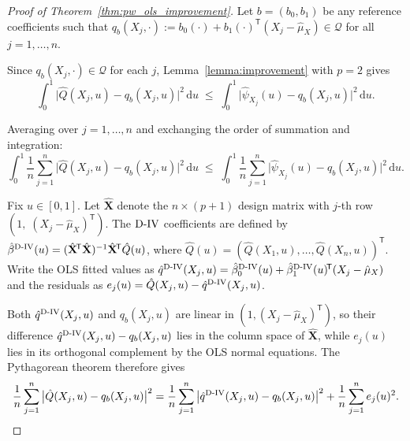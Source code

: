 \documentclass[12pt]{article}
\newcommand{\T}{\mathsf{T}} %
\newcommand{\est}{\ensuremath{\textnormal{D-IV}}\xspace}
\newcommand{\dd}{\mathrm{d}} %
\begin{document}
\begin{proof}[Proof of Theorem~\ref{thm:pw_ols_improvement}]
Let $b = (b_0, b_1)$ be any reference coefficients such that $q_b(X_j, \cdot) := b_0(\cdot) + b_1(\cdot)^{\!\T}(X_j - \hat{\mu}_X) \in \mathcal{Q}$ for all $j = 1, \ldots, n$.

\medskip
Since $q_b(X_j, \cdot) \in \mathcal{Q}$ for each $j$, Lemma~\ref{lemma:improvement} with $p = 2$ gives
\[
\int_0^1 \big|\hat{Q}(X_j, u) - q_b(X_j, u)\big|^2\, \dd u \;\leq\; \int_0^1 \big|\hat{\psi}_{X_j}(u) - q_b(X_j, u)\big|^2\, \dd u.
\]


Averaging over $j = 1, \ldots, n$ and exchanging the order of summation and integration:
\begin{equation}\label{eq:avg_improvement_pf}
\int_0^1 \frac{1}{n}\sum_{j=1}^n \big|\hat{Q}(X_j, u) - q_b(X_j, u)\big|^2\, \dd u \;\leq\; \int_0^1 \frac{1}{n}\sum_{j=1}^n \big|\hat{\psi}_{X_j}(u) - q_b(X_j, u)\big|^2\, \dd u.
\end{equation}


Fix $u \in [0,1]$. Let $\hat{\mathbf{X}}$ denote the $n \times (p+1)$ design matrix with $j$-th row $(1,\; (X_j - \hat{\mu}_X)^{\!\T})$. The \est coefficients are defined by $\hat{\beta}^{\est}(u) = (\hat{\mathbf{X}}^{\!\T}\hat{\mathbf{X}})^{-1}\hat{\mathbf{X}}^{\!\T} \hat{Q}(u)$, where $\hat{Q}(u) = (\hat{Q}(X_1,u),\ldots,\hat{Q}(X_n,u))^{\!\T}$. Write the OLS fitted values as $\hat{q}^{\est}(X_j, u) = \hat{\beta}_0^{\est}(u) + \hat{\beta}_1^{\est}(u)^{\!\T}(X_j - \hat{\mu}_X)$ and the residuals as $e_j(u) = \hat{Q}(X_j, u) - \hat{q}^{\est}(X_j, u)$.

Both $\hat{q}^{\est}(X_j, u)$ and $q_b(X_j, u)$ are linear in $(1, (X_j - \hat{\mu}_X)^{\!\T})$, so their difference $\hat{q}^{\est}(X_j, u) - q_b(X_j, u)$ lies in the column space of $\hat{\mathbf{X}}$, while $e_j(u)$ lies in its orthogonal complement by the OLS normal equations. The Pythagorean theorem therefore gives
\begin{equation}\label{eq:pythag_pf}
\frac{1}{n}\sum_{j=1}^n \big|\hat{Q}(X_j, u) - q_b(X_j, u)\big|^2 = \frac{1}{n}\sum_{j=1}^n \big|\hat{q}^{\est}(X_j, u) - q_b(X_j, u)\big|^2 + \frac{1}{n}\sum_{j=1}^n e_j(u)^2.
\end{equation}



\end{proof}
\end{document}
